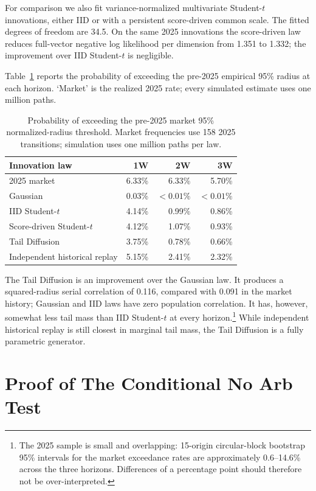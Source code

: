\documentclass[11pt,a4paper]{article}
\begin{document}
For comparison we also fit variance-normalized multivariate Student-$t$
innovations, either IID or with a persistent score-driven common scale.  The
fitted degrees of freedom are 34.5.  On the same 2025 innovations the
score-driven law reduces full-vector negative log likelihood per dimension
from 1.351 to 1.332; the improvement over IID Student-$t$ is negligible.

Table~\ref{tab:tails} reports the probability of exceeding the pre-2025
empirical 95\% radius at each horizon.  `Market' is the realized 2025 rate;
every simulated estimate uses one million paths.

\begin{table}[H]
\centering
\small
\begin{tabular}{lrrr}
\toprule
Innovation law & 1W & 2W & 3W\\
\midrule
2025 market & 6.33\% & 6.33\% & 5.70\%\\
Gaussian & 0.03\% & $<0.01\%$ & $<0.01\%$\\
IID Student-$t$ & 4.14\% & 0.99\% & 0.86\%\\
Score-driven Student-$t$ & 4.12\% & 1.07\% & 0.93\%\\
Tail Diffusion & 3.75\% & 0.78\% & 0.66\%\\
Independent historical replay & 5.15\% & 2.41\% & 2.32\%\\
\bottomrule
\end{tabular}
\caption{Probability of exceeding the pre-2025 market 95\% normalized-radius
threshold.  Market frequencies use 158 2025 transitions; simulation uses one
million paths per law.}
\label{tab:tails}
\end{table}

The Tail Diffusion is an improvement over the Gaussian law. 
 It produces a squared-radius serial correlation of 0.116,
compared with 0.091 in the market history; Gaussian and IID laws have zero
population correlation. It has, however, somewhat less tail mass than IID Student-$t$ at every horizon.\footnote{The 2025
sample is small and overlapping: 15-origin circular-block bootstrap 95\%
intervals for the market exceedance rates are approximately 0.6--14.6\%
across the three horizons.  Differences of a percentage point
should therefore not be over-interpreted.  } While independent historical replay is
still closest in marginal tail mass, the Tail Diffusion is a fully
parametric generator.

\section{Proof of The Conditional No Arb Test}
\label{sec:proof-cond-no-arb}
\end{document}
